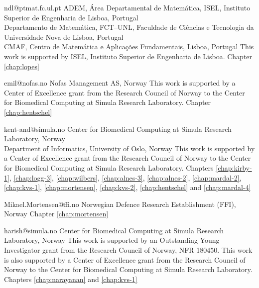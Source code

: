              {ndl@ptmat.fc.ul.pt}
             {ADEM, \'{A}rea Departamental de Matem\'{a}tica,
              ISEL, Instituto Superior de Engenharia de Lisboa, Portugal \\
              Departamento de Matem\'{a}tica, FCT--UNL,
              Faculdade de Ci\^{e}ncias e Tecnologia da Universidade Nova de Lisboa, Portugal \\
              CMAF, Centro de Matem\'{a}tica e Aplica\c{c}\~{o}es Fundamentais, Lisboa, Portugal}
              {This work is supported by ISEL, Instituto Superior de Engenharia de Lisboa.}
              {Chapter \ref{chap:lopes}}

             {emil@nofas.no}
             {Nofas Management AS, Norway}
             {This work is supported by a Center of Excellence
              grant from the Research Council of Norway to the Center
              for Biomedical Computing at Simula Research
              Laboratory.}
             {Chapter \ref{chap:hentschel}}

             {kent-and@simula.no}
             {Center for Biomedical Computing at Simula Research Laboratory, Norway \\
              Department of Informatics, University of Oslo, Norway}
             {This work is supported by a Center of Excellence grant
              from the Research Council of Norway to the Center for
              Biomedical Computing at Simula Research Laboratory.}
             {Chapters
              \ref{chap:kirby-1}, \ref{chap:logg-3}, \ref{chap:wilbers},
              \ref{chap:alnes-3}, \ref{chap:alnes-2}, \ref{chap:mardal-2},
              \ref{chap:kvs-1}, \ref{chap:mortensen}, \ref{chap:kvs-2},
              \ref{chap:hentschel} and \ref{chap:mardal-4}}

             {Mikael.Mortensen@ffi.no}
             {Norwegian Defence Research Establishment (FFI), Norway}
             {}
             {Chapter \ref{chap:mortensen}}

             {harish@simula.no}
             {Center for Biomedical Computing at Simula Research Laboratory, Norway}
             {This work is supported by an Outstanding Young
              Investigator grant from the Research Council of Norway,
              NFR 180450. This work is also supported by a Center of
              Excellence grant from the Research Council of Norway to
              the Center for Biomedical Computing at Simula Research
              Laboratory.}
             {Chapters \ref{chap:narayanan} and \ref{chap:kvs-1}}

